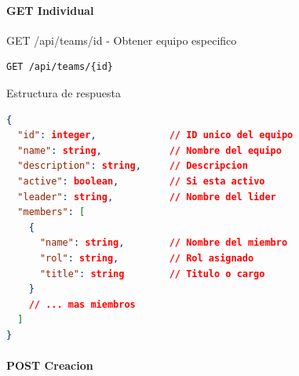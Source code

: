 \documentclass[11pt,a4paper]{article}
\begin{document}
\paragraph{GET Individual}

\begin{center}
	\begin{minipage}{\textwidth}
		\begin{codebox}{GET /api/teams/{id} - Obtener equipo especifico}
			\begin{lstlisting}[language=HTTP]
GET /api/teams/{id}
\end{lstlisting}
		\end{codebox}
	\end{minipage}
\end{center}

\begin{center}
	\begin{minipage}{\textwidth}
		\begin{codebox}{Estructura de respuesta}
			\begin{lstlisting}[language=json]
{
  "id": integer,             // ID unico del equipo
  "name": string,            // Nombre del equipo
  "description": string,     // Descripcion
  "active": boolean,         // Si esta activo
  "leader": string,          // Nombre del lider
  "members": [
    {
      "name": string,        // Nombre del miembro
      "rol": string,         // Rol asignado
      "title": string        // Titulo o cargo
    }
    // ... mas miembros
  ]
}
\end{lstlisting}
		\end{codebox}
	\end{minipage}
\end{center}

\paragraph{POST Creacion}
\end{document}
